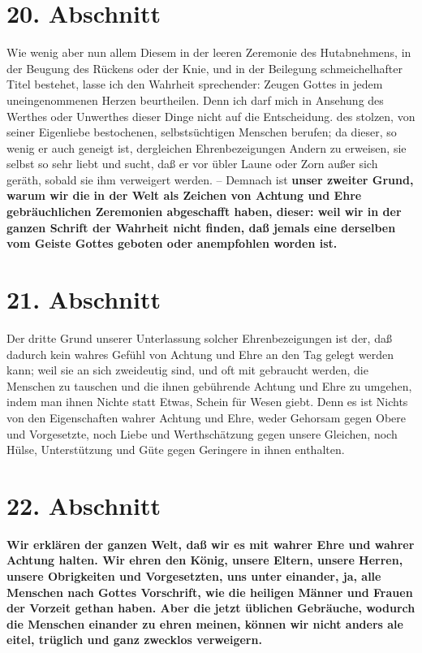 \section{20. Abschnitt} \label{kap9_ab20}

Wie wenig aber nun allem Diesem in der leeren Zeremonie des Hutabnehmens, in
der Beugung des Rückens oder der Knie, und in der Beilegung schmeichelhafter
Titel bestehet, lasse ich den Wahrheit sprechender: Zeugen Gottes in jedem
uneingenommenen Herzen beurtheilen. Denn ich darf mich in Ansehung des Werthes
oder Unwerthes dieser Dinge nicht auf die Entscheidung. des stolzen, von seiner
Eigenliebe bestochenen, selbstsüchtigen Menschen berufen; da dieser, so wenig er
auch geneigt ist, dergleichen Ehrenbezeigungen Andern zu erweisen, sie selbst so
sehr liebt und sucht, daß er vor übler Laune oder Zorn außer sich geräth, sobald
sie ihm verweigert werden. -- Demnach ist \textbf{unser zweiter Grund, warum wir
die in
der Welt als Zeichen von Achtung und Ehre gebräuchlichen Zeremonien abgeschafft
haben, dieser: weil wir in der ganzen Schrift der Wahrheit nicht finden, daß
jemals eine derselben vom Geiste Gottes geboten oder anempfohlen worden ist.}

\section{21. Abschnitt} \label{kap9_ab21}

Der dritte Grund unserer Unterlassung solcher Ehrenbezeigungen ist der, daß
dadurch kein wahres Gefühl von Achtung und Ehre an den Tag gelegt werden kann;
weil sie an sich zweideutig sind, und oft mit gebraucht werden, die Menschen zu
tauschen und die ihnen gebührende Achtung und Ehre zu umgehen, indem man ihnen
Nichte statt Etwas, Schein für Wesen giebt. Denn es ist Nichts von den
Eigenschaften wahrer Achtung und Ehre, weder Gehorsam gegen Obere und
Vorgesetzte, noch Liebe und Werthschätzung gegen unsere Gleichen, noch Hülse,
Unterstützung und Güte gegen Geringere in ihnen enthalten.

\section{22. Abschnitt} \label{kap9_ab22}

\textbf{Wir erklären der ganzen Welt, daß wir es mit wahrer Ehre und wahrer
Achtung
halten. Wir ehren den König, unsere Eltern, unsere Herren,
unsere Obrigkeiten
und Vorgesetzten, uns unter einander, ja, alle
Menschen nach Gottes Vorschrift,
wie die heiligen Männer und Frauen der Vorzeit gethan haben. Aber die jetzt
üblichen Gebräuche, wodurch die Menschen einander zu ehren meinen, können wir
nicht anders ale eitel, trüglich und ganz zwecklos verweigern.}

